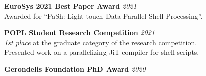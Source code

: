 \documentclass[margin]{res}
\begin{document}
\begin{resume}
\textbf{EuroSys 2021 Best Paper Award} \hfill {\em 2021} \\
Awarded for ``PaSh: Light-touch Data-Parallel Shell Processing''.

\textbf{POPL Student Research Competition} \hfill {\em 2021} \\
\textit{1st place} at the graduate category of the research competition. \\
Presented work on a parallelizing JiT compiler for shell scripts. 

\textbf{Gerondelis Foundation PhD Award} \hfill {\em 2020}








\end{resume}
\end{document}
